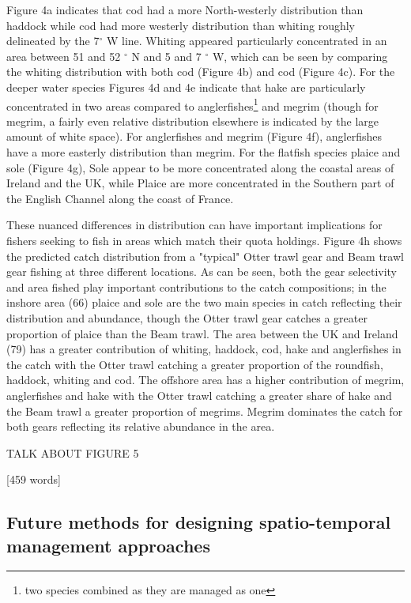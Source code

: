 \documentclass{nature}
\begin{document}
\begin{linenumbers}
Figure 4a indicates that cod had a more North-westerly distribution than
haddock while cod had more westerly distribution than whiting roughly
delineated by the 7$^{\circ}$ W line. Whiting appeared particularly
concentrated in an area between 51 and 52 $^{\circ}$ N and 5 and 7 $^{\circ}$
W, which can be seen by comparing the whiting distribution with both cod
(Figure 4b) and cod (Figure 4c). For the deeper water species Figures 4d and 4e
indicate that hake are particularly concentrated in two areas compared to
anglerfishes\footnote{two species combined as they are managed as one} and
megrim (though for megrim, a fairly even relative distribution elsewhere is
indicated by the large amount of white space). For anglerfishes and megrim
(Figure 4f), anglerfishes have a more easterly distribution than megrim. For
the flatfish species plaice and sole (Figure 4g), Sole appear to be more
concentrated along the coastal areas of Ireland and the UK, while Plaice are
more concentrated in the Southern part of the English Channel along the coast
of France.

These nuanced differences in distribution can have important implications for
fishers seeking to fish in areas which match their quota holdings. Figure 4h
shows the predicted catch distribution from a "typical" Otter trawl gear and
Beam trawl gear fishing at three different locations. As can be seen, both the
gear selectivity and area fished play important contributions to the catch
compositions; in the inshore area (66) plaice and sole are the two main species
in catch reflecting their distribution and abundance, though the Otter trawl
gear catches a greater proportion of plaice than the Beam trawl. The area
between the UK and Ireland (79) has a greater contribution of whiting, haddock,
cod, hake and anglerfishes in the catch with the Otter trawl catching a greater
proportion of the roundfish, haddock, whiting and cod. The offshore area has a
higher contribution of megrim, anglerfishes and hake with the Otter trawl
catching a greater share of hake and the Beam trawl a greater proportion of
megrims. Megrim dominates the catch for both gears reflecting its relative
abundance in the area.

TALK ABOUT FIGURE 5

[459 words]

\subsection{Future methods for designing spatio-temporal management approaches}


\end{linenumbers}
\end{document}
